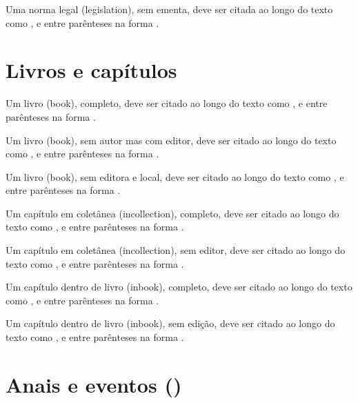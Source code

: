 \documentclass[a4paper,12pt]{article}
\begin{document}
Uma norma legal (legislation), sem ementa, deve ser citada ao longo do texto como \citet{leg-2-missing-ementa}, e entre parênteses na forma \citep{leg-2-missing-ementa}.



\section*{Livros e capítulos}

Um livro (book), completo, deve ser citado ao longo do texto como \citet{book-1-complete}, e entre parênteses na forma \citep{book-1-complete}.


Um livro (book), sem autor mas com editor, deve ser citado ao longo do texto como \citet{book-2-missing-author-has-editor}, e entre parênteses na forma \citep{book-2-missing-author-has-editor}.


Um livro (book), sem editora e local, deve ser citado ao longo do texto como \citet{book-3-missing-publisher-location}, e entre parênteses na forma \citep{book-3-missing-publisher-location}.


Um capítulo em coletânea (incollection), completo, deve ser citado ao longo do texto como \citet{incoll-1-complete}, e entre parênteses na forma \citep{incoll-1-complete}.


Um capítulo em coletânea (incollection), sem editor, deve ser citado ao longo do texto como \citet{incoll-2-missing-editor}, e entre parênteses na forma \citep{incoll-2-missing-editor}.


Um capítulo dentro de livro (inbook), completo, deve ser citado ao longo do texto como \citet{inbook-1-complete}, e entre parênteses na forma \citep{inbook-1-complete}.


Um capítulo dentro de livro (inbook), sem edição, deve ser citado ao longo do texto como \citet{inbook-2-missing-edition}, e entre parênteses na forma \citep{inbook-2-missing-edition}.



\section*{Anais e eventos (\string\printeventdate)}
\end{document}
